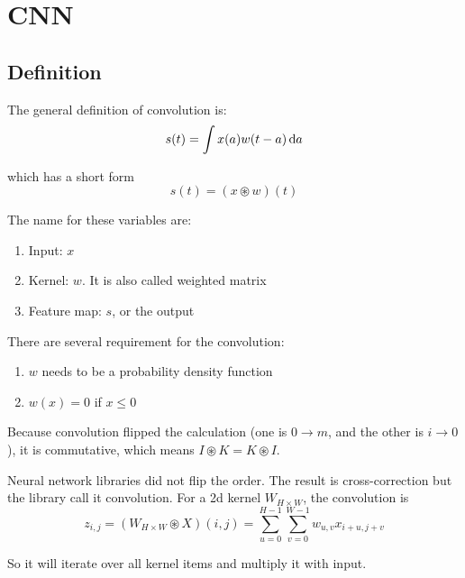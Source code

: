 \chapter{CNN}

\section{Definition}

\begin{definition}[Convolution]

The general definition of convolution is:
\begin{equation}
    s(t) = \int x(a) w(t-a) \dif a
\end{equation}

which has a short form
\begin{equation}
    s(t) = (x \circledast w)(t)
\end{equation}

The name for these variables are:
\begin{enumerate}
    \item Input: $x$
    \item Kernel: $w$. It is also called weighted matrix
    \item Feature map: $s$, or the output
\end{enumerate}
    
\end{definition}

There are several requirement for the convolution:
\begin{enumerate}
    \item $w$ needs to be a probability density function
    \item $w(x) = 0$ if $x \leq 0$
\end{enumerate}

Because convolution flipped the calculation (one is $0 \rightarrow m$, and the other is $i \rightarrow 0$), it is commutative, which means $I \circledast K = K \circledast I$.

\begin{definition}
    Neural network libraries did not flip the order. The result is cross-correction but the library call it convolution. For a 2d kernel $W_{H \times W}$, the convolution is
    \begin{equation}
        z_{i,j} = (W_{H \times W} \circledast X) (i,j) = \sum_{u=0}^{H-1} \sum_{v=0}^{W-1} w_{u,v} x_{i+u,j+v}
    \end{equation}
    
    So it will iterate over all kernel items and multiply it with input.
\end{definition}

